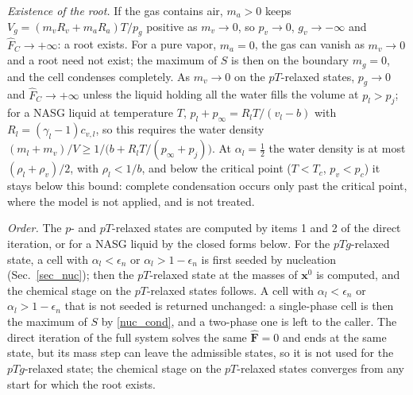 \emph{Existence of the root.} If the gas contains air, $m_a>0$ keeps $V_g=(m_vR_v+m_aR_a)T/p_g$ positive as $m_v\to0$, so $p_v\to0$, $g_v\to-\infty$ and $\hat{F}_C\to+\infty$: a root exists. For a pure vapor, $m_a=0$, the gas can vanish as $m_v\to0$ and a root need not exist; the maximum of $S$ is then on the boundary $m_g=0$, and the cell condenses completely. As $m_v\to0$ on the $pT$-relaxed states, $p_g\to0$ and $\hat{F}_C\to+\infty$ unless the liquid holding all the water fills the volume at $p_l>p_{j}$; for a NASG liquid at temperature $T$, $p_l+p_\infty=R_lT/(v_l-b)$ with $R_l=(\gamma_l-1)c_{v,l}$, so this requires the water density $(m_l+m_v)/V\ge1/\bigl(b+R_lT/(p_\infty+p_{j})\bigr)$. At $\alpha_l=\tfrac12$ the water density is at most $(\rho_l+\rho_v)/2$, with $\rho_l<1/b$, and below the critical point ($T<T_c$, $p_v<p_c$) it stays below this bound: complete condensation occurs only past the critical point, where the model is not applied, and is not treated.

\emph{Order.} The $p$- and $pT$-relaxed states are computed by items 1 and 2 of the direct iteration, or for a NASG liquid by the closed forms below. For the $pTg$-relaxed state, a cell with $\alpha_l<\epsilon_n$ or $\alpha_l>1-\epsilon_n$ is first seeded by nucleation (Sec.~\ref{sec_nuc}); then the $pT$-relaxed state at the masses of $\boldsymbol{x}^0$ is computed, and the chemical stage on the $pT$-relaxed states follows. A cell with $\alpha_l<\epsilon_n$ or $\alpha_l>1-\epsilon_n$ that is not seeded is returned unchanged: a single-phase cell is then the maximum of $S$ by \eqref{nuc_cond}, and a two-phase one is left to the caller. The direct iteration of the full system solves the same $\hat{\boldsymbol{F}}=0$ and ends at the same state, but its mass step can leave the admissible states, so it is not used for the $pTg$-relaxed state; the chemical stage on the $pT$-relaxed states converges from any start for which the root exists.

